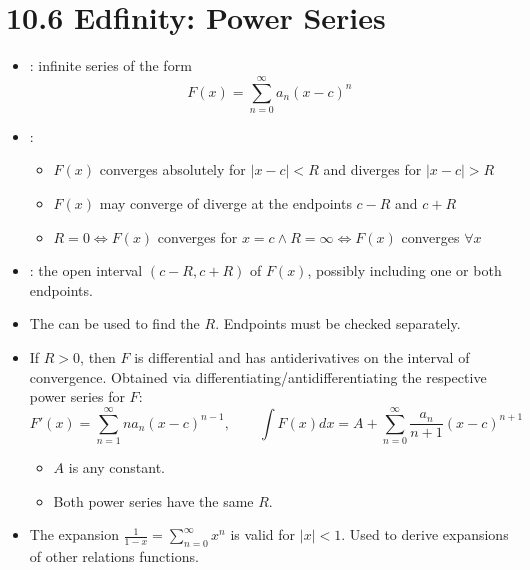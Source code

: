 \section{10.6 Edfinity: Power Series}
\begin{itemize}
  \item {}: infinite series of the form
    \[%
    F (x) = \sum_{n=0}^{\infty} a_n (x - c)^n
    \]%
  \item {}:
    \begin{itemize}
      \item \(F(x)\) converges absolutely for \(\left|x -c \right| < R\) and
        diverges for \(\left|x - c\right| > R\)
      \item \(F (x) \) may converge of diverge at the endpoints \(c-R\) and \(c+R\)
      \item \(R=0 \iff F (x) \) converges for \(x = c \land R = \infty \iff F
        (x)\) converges \(\forall x\)
    \end{itemize}
  \item {}: the open interval \((c-R, c+R)\) of
    \(F(x) \), possibly including one or both endpoints.

  \item The  can be used to find the \(R\). Endpoints must be
    checked separately.

  \item If \(R > 0\), then \(F\) is differential and has antiderivatives on the
    interval of convergence. Obtained via differentiating/antidifferentiating
    the respective power series for \(F\):
    \[%
    F' (x) = \sum_{n=1}^{\infty} n a_n (x - c)^{n-1}, \qquad
    \int F (x) dx = A + \sum_{n=0}^{\infty} \frac{a_n}{n+1}(x-c)^{n+1}
    \]%
    \begin{itemize}
      \item \(A\) is any constant.
      \item Both power series have the same \(R\).
    \end{itemize}

  \item The expansion \(\displaystyle \frac{1}{1-x} = \sum_{n=0}^{\infty} x^n
    \) is valid for \(|x| < 1\). Used to derive expansions of other relations
    functions.


\end{itemize}
